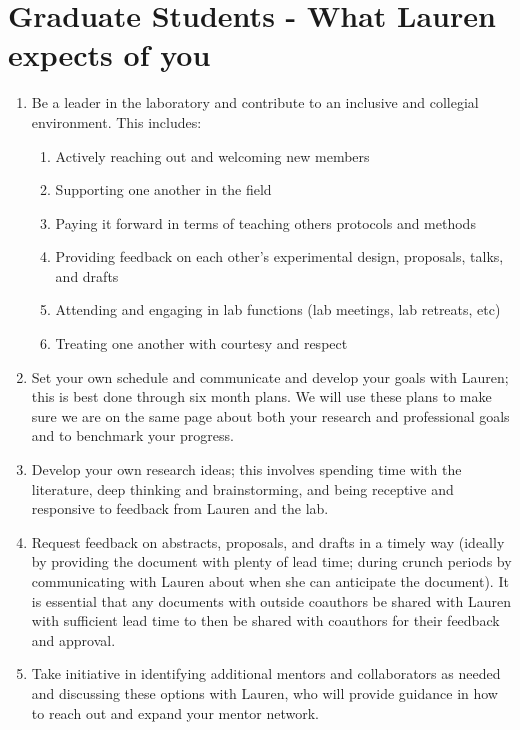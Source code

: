 \documentclass[12pt]{article}
\begin{document}
\section{Graduate Students - What Lauren expects of you}
\begin{enumerate}
\item Be a leader in the laboratory and contribute to an inclusive and collegial environment. This includes:
\begin{enumerate}
\item Actively reaching out and welcoming new members
\item Supporting one another in the field 
\item Paying it forward in terms of teaching others protocols and methods
\item Providing feedback on each other's experimental design, proposals, talks, and drafts
\item Attending and engaging in lab functions (lab meetings, lab retreats, etc) 
\item Treating one another with courtesy and respect
\end{enumerate}

\item Set your own schedule and communicate and develop your goals with Lauren; this is best done through six month plans. We will use these plans to make sure we are on the same page about both your research and professional goals and to benchmark your progress.

\item Develop your own research ideas; this involves spending time with the literature, deep thinking and brainstorming, and being receptive and responsive to feedback from Lauren and the lab.

\item Request feedback on abstracts, proposals, and drafts in a timely way (ideally by providing the document with plenty of lead time; during crunch periods by communicating with Lauren about when she can anticipate the document). It is essential that any documents with outside coauthors be shared with Lauren with sufficient lead time to then be shared with coauthors for their feedback and approval.

\item Take initiative in identifying additional mentors and collaborators as needed and discussing these options with Lauren, who will provide guidance in how to reach out and expand your mentor network.


\end{enumerate}
\end{document}
